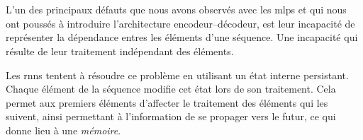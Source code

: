 \section{}
\label{sec.rnn}

L'un des principaux défauts que nous avons observés avec les \glspl{mlp} 
et qui nous ont poussés à introduire l'architecture encodeur--décodeur,
est leur incapacité de représenter la dépendance entres les éléments d'une séquence.
Une incapacité qui résulte de leur traitement indépendant des éléments.

Les \glspl{rnn} tentent à résoudre ce problème en utilisant un état interne persistant.
Chaque élément de la séquence modifie cet état lors de son traitement.
Cela permet aux premiers éléments d'affecter le traitement des éléments qui les suivent, 
ainsi permettant à l'information de se propager vers le futur,
ce qui donne lieu à une \emph{mémoire}.
